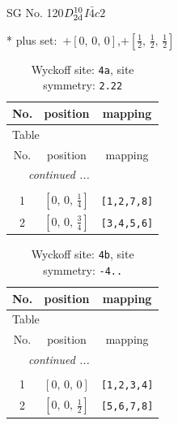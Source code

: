 \documentclass[fleqn,8pt]{jsarticle}
\begin{document}
\setcounter{MaxMatrixCols}{32}

\renewcommand{\tablename}{Table~}
\renewcommand{\figurename}{Figure~}
\begin{center}
\LARGE
SG No. 120\quad$D_{\rm 2d}^{10}$\quad$I\bar{4}c2$\quad[ tetragonal ]
\end{center}
* plus set:\,\,\,$+\left[ 0,\, 0,\, 0 \right]$,\quad $+\left[ \frac{1}{2},\, \frac{1}{2},\, \frac{1}{2} \right]$
\renewcommand{\arraystretch}{1.2}
\begin{longtable}{ccc}
\caption{Wyckoff site: {\tt 4a}, site symmetry: {\tt 2.22}}
 \\
 \hline \hline
No. & position & mapping \\ \hline \endfirsthead

\multicolumn{2}{l}{\tablename\ \thetable{}} \\
 \hline \hline
No. & position & mapping \\ \hline \endhead

 \hline \hline
\multicolumn{2}{r}{\footnotesize\it continued ...} \\ \endfoot

 \hline \hline
\multicolumn{2}{r}{} \\ \endlastfoot

1 & $\left[ 0,\, 0,\, \frac{1}{4} \right]$ & {\tt [1,2,7,8]} \\ \hline
2 & $\left[ 0,\, 0,\, \frac{3}{4} \right]$ & {\tt [3,4,5,6]} \\
\end{longtable}
\renewcommand{\arraystretch}{1.2}
\begin{longtable}{ccc}
\caption{Wyckoff site: {\tt 4b}, site symmetry: {\tt -4..}}
 \\
 \hline \hline
No. & position & mapping \\ \hline \endfirsthead

\multicolumn{2}{l}{\tablename\ \thetable{}} \\
 \hline \hline
No. & position & mapping \\ \hline \endhead

 \hline \hline
\multicolumn{2}{r}{\footnotesize\it continued ...} \\ \endfoot

 \hline \hline
\multicolumn{2}{r}{} \\ \endlastfoot

1 & $\left[ 0,\, 0,\, 0 \right]$ & {\tt [1,2,3,4]} \\ \hline
2 & $\left[ 0,\, 0,\, \frac{1}{2} \right]$ & {\tt [5,6,7,8]} \\
\end{longtable}
\end{document}
